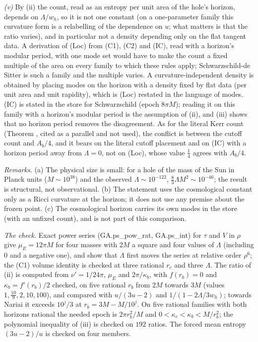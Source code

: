 \emph{(v)} By (ii) the count, read as an entropy per unit area of the hole's horizon, depends on $\Lambda/w_{h}$, so it is not one constant (on a one-parameter family this curvature form is a relabelling of the dependence on $u$; what matters is that the ratio varies), and in particular not a density depending only on the flat tangent data. A derivation of (Loc) from (C1), (C2) and (IC), read with a horizon's modular period, with one mode set would have to make the count a fixed multiple of the area on every family to which these rules apply; Schwarzschild-de Sitter is such a family and the multiple varies. A curvature-independent density is obtained by placing modes on the horizon with a density fixed by flat data (per unit area and unit rapidity), which is (Loc) restated in the language of modes. (IC) is stated in the store for Schwarzschild (epoch $8\pi M$); reading it on this family with a horizon's modular period is the assumption of (ii), and (iii) shows that no horizon period removes the disagreement. As for the literal Kerr count (Theorem , cited as a parallel and not used), the conflict is between the cutoff count and $A_{b}/4$, and it bears on the literal cutoff placement and on (IC) with a horizon period away from $\Lambda = 0$, not on (Loc), whose value $\tfrac14$ agrees with $A_{b}/4$.

\emph{Remarks.} (a) The physical size is small: for a hole of the mass of the Sun in Planck units ($M \sim 10^{38}$) and the observed $\Lambda \sim 10^{-122}$, $\tfrac83\Lambda M^{2} \sim 10^{-46}$; the result is structural, not observational. (b) The statement uses the cosmological constant only as a Ricci curvature at the horizon; it does not use any premise about the frozen point. (c) The cosmological horizon carries its own modes in the store (with an unfixed count), and is not part of this comparison.

\emph{The check.} Exact power series (GA.ps\_pow\_rat, GA.ps\_int) for $\tau$ and $V$ in $\rho$ give $\mu_{E} = 12\pi M$ for four masses with $2M$ a square and four values of $\Lambda$ (including $0$ and a negative one), and show that $\Lambda$ first moves the series at relative order $\rho^{6}$; the (C1) volume identity is checked at three rational $r_{c}$ and three $\Lambda$. The ratio of (ii) is computed from $\nu' = 1/24\pi$, $\mu_{E}$ and $2\pi/\kappa_{b}$, with $f(r_{b}) = 0$ and $\kappa_{b} = f'(r_{b})/2$ checked, on five rational $r_{b}$ from $2M$ towards $3M$ (values $1, \tfrac{10}{9}, 2, 10, 100$), and compared with $u/(3u - 2)$ and $1/(1 - 2\Lambda/3w_{h})$; towards Nariai it exceeds $10^{j}/3$ at $r_{b} = 3M - M/10^{j}$. On five rational families with both horizons rational the needed epoch is $2\pi r_{b}^{2}/M$ and $0 < \kappa_{c} < \kappa_{b} < M/r_{b}^{2}$; the polynomial inequality of (iii) is checked on $192$ ratios. The forced mean entropy $(3u - 2)/u$ is checked on four members.

